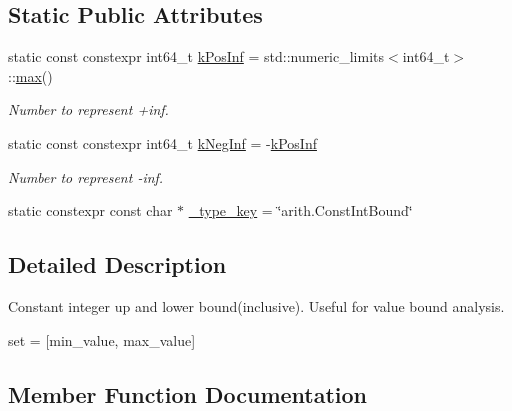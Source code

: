 \subsection*{Static Public Attributes}
\begin{DoxyCompactItemize}
\item 
static const constexpr int64\+\_\+t \hyperlink{classtvm_1_1arith_1_1ConstIntBoundNode_a035f9270597638a44a55dd2552f4ad20}{k\+Pos\+Inf} = std\+::numeric\+\_\+limits$<$int64\+\_\+t$>$\+::\hyperlink{namespacetvm_ab49bad0808ba033343e72ba37b39af2e}{max}()
\begin{DoxyCompactList}\small\item\em Number to represent +inf. \end{DoxyCompactList}\item 
static const constexpr int64\+\_\+t \hyperlink{classtvm_1_1arith_1_1ConstIntBoundNode_a0d8f5f54f4f380f664016f466f100b3a}{k\+Neg\+Inf} = -\/\hyperlink{classtvm_1_1arith_1_1ConstIntBoundNode_a035f9270597638a44a55dd2552f4ad20}{k\+Pos\+Inf}
\begin{DoxyCompactList}\small\item\em Number to represent -\/inf. \end{DoxyCompactList}\item 
static constexpr const char $\ast$ \hyperlink{classtvm_1_1arith_1_1ConstIntBoundNode_a652c9c965a3942f1ca45f7929ddd554c}{\+\_\+type\+\_\+key} = \char`\"{}arith.\+Const\+Int\+Bound\char`\"{}
\end{DoxyCompactItemize}


\subsection{Detailed Description}
Constant integer up and lower bound(inclusive). Useful for value bound analysis. 

set = \mbox{[}min\+\_\+value, max\+\_\+value\mbox{]} 

\subsection{Member Function Documentation}
